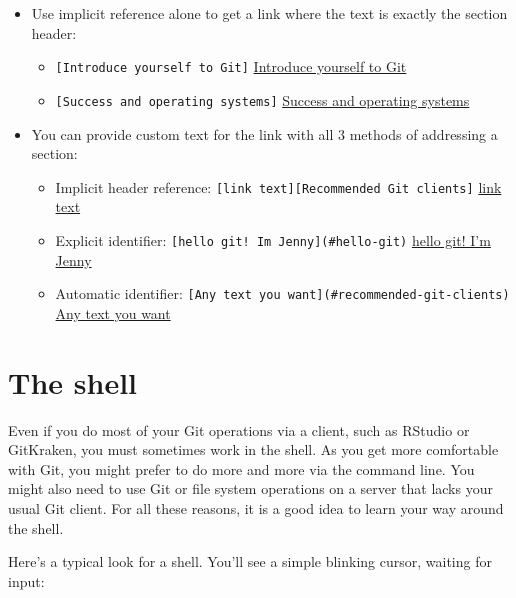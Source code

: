 \documentclass[
]{book}
\providecommand{\tightlist}{%
  \setlength{\itemsep}{0pt}\setlength{\parskip}{0pt}}
\begin{document}
\begin{itemize}
\tightlist
\item
  Use implicit reference alone to get a link where the text is exactly the section header:

  \begin{itemize}
  \tightlist
  \item
    \texttt{{[}Introduce\ yourself\ to\ Git{]}} \hyperref[hello-git]{Introduce yourself to Git}
  \item
    \texttt{{[}Success\ and\ operating\ systems{]}} \hyperref[success-and-operating-systems]{Success and operating systems}
  \end{itemize}
\item
  You can provide custom text for the link with all 3 methods of addressing a section:

  \begin{itemize}
  \tightlist
  \item
    Implicit header reference: \texttt{{[}link\ text{]}{[}Recommended\ Git\ clients{]}} \hyperref[recommended-git-clients]{link text}\\
  \item
    Explicit identifier: \texttt{{[}hello\ git!\ I\textquotesingle{}m\ Jenny{]}(\#hello-git)} \hyperref[hello-git]{hello git! I'm Jenny}
  \item
    Automatic identifier: \texttt{{[}Any\ text\ you\ want{]}(\#recommended-git-clients)} \hyperref[recommended-git-clients]{Any text you want}
  \end{itemize}
\end{itemize}

\appendix


\chapter{The shell}\label{shell}

Even if you do most of your Git operations via a client, such as RStudio or GitKraken, you must sometimes work in the shell. As you get more comfortable with Git, you might prefer to do more and more via the command line. You might also need to use Git or file system operations on a server that lacks your usual Git client. For all these reasons, it is a good idea to learn your way around the shell.

Here's a typical look for a shell. You'll see a simple blinking cursor, waiting for input:
\end{document}
